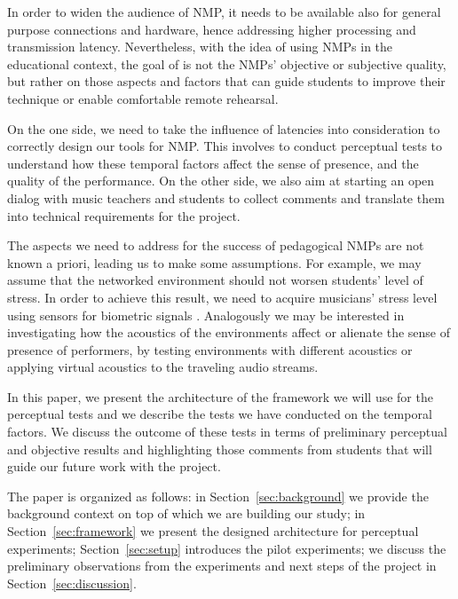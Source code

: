In order to widen the audience of NMP, it needs to be available also for general purpose connections and hardware, hence addressing higher processing and transmission latency. Nevertheless, with the idea of using NMPs in the educational context, the goal of is not the NMPs' objective or subjective quality, but rather on those aspects and factors that can guide students to improve their technique or enable comfortable remote rehearsal. 

On the one side, we need to take the influence of latencies into consideration to correctly design our tools for NMP. This involves to conduct perceptual tests to understand how these temporal factors affect the sense of presence, and the quality of the performance. On the other side, we also aim at starting an open dialog with music teachers and students to collect comments and translate them into technical requirements for the project. 

The aspects we need to address for the success of pedagogical NMPs are not known a priori, leading us to make some assumptions. For example, we may assume that the networked environment should not worsen students' level of stress. In order to achieve this result, we need to acquire musicians' stress level using sensors for biometric signals \cite{Yoshie2009}. Analogously we may be interested in investigating how the acoustics of the environments affect or alienate the sense of presence of performers, by testing environments with different acoustics or applying virtual acoustics to the traveling audio streams.

In this paper, we present the architecture of the framework we will use for the perceptual tests and we describe the tests we have conducted on the temporal factors. We discuss the outcome of these tests in terms of preliminary perceptual and objective results and highlighting those comments from students that will guide our future work with the project.

The paper is organized as follows: in Section~\ref{sec:background} we provide the background context on top of which we are building our study; in Section~\ref{sec:framework} we present the designed architecture for perceptual experiments; Section~\ref{sec:setup} introduces the pilot experiments; we discuss the preliminary observations from the experiments and next steps of the project in Section~\ref{sec:discussion}.


